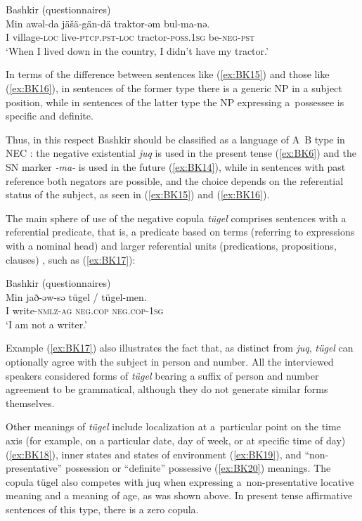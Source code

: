 \documentclass[output=paper]{langsci/langscibook}
\begin{document}
\ea Bashkir (questionnaires) \label{ex:BK16}\\
    \gll Min	awǝl-da		jäšä-gän-dä		traktor-ǝm  bul-ma-nǝ.\\
    I		village-\textsc{loc}	live-\textsc{ptcp.pst-loc}	tractor-\textsc{poss.1sg} be-\textsc{neg-pst}\\
	\glt `When I lived down in the country, I didn’t have my tractor.'
\z


In terms of the difference between sentences like (\ref{ex:BK15}) and those like (\ref{ex:BK16}), in sentences of the former type there is a generic NP in a subject position, while in sentences of the latter type the NP expressing a possessee is specific and definite.

Thus, in this respect Bashkir should be classified as a language of A~B type in NEC \citep{Veselinova2016}: the negative existential \textit{juq} is used in the present tense (\ref{ex:BK6}) and the SN marker \textit{-ma-} is used in the future (\ref{ex:BK14}), while in sentences with past reference both negators are possible, and the choice depends on the referential status of the subject, as seen in (\ref{ex:BK15}) and (\ref{ex:BK16}).

The main sphere of use of the negative copula \textit{tügel} comprises sentences with a referential predicate, that is, a predicate based on terms (referring to expressions with a nominal head) and larger referential units (predications, propositions, clauses) \citep[77–91]{hengeveld1992}, such as (\ref{ex:BK17}):

\ea Bashkir (questionnaires) \label{ex:BK17}\\
	\gll Min	jað-əw-sə			tügel			{/ tügel-men.}\\
	I		write-\textsc{nmlz-ag}	\textsc{neg.cop}		\textsc{neg.cop-1sg}\\
	\glt `I am not a writer.'
\z

Example (\ref{ex:BK17}) also illustrates the fact that, as distinct from \textit{juq}, \textit{tügel} can optionally agree with the subject in person and number. All the interviewed speakers considered forms of \textit{tügel} bearing a suffix of person and number agreement to be grammatical, although they do not generate similar forms themselves.

Other meanings of \textit{tügel} include localization at a particular point on the time axis (for example, on a particular date, day of week, or at specific time of day) (\ref{ex:BK18}), inner states and states of environment (\ref{ex:BK19}), and “non-presentative” possession \citep{hengeveld1992} or “definite” possessive \citep{stassen2009a} (\ref{ex:BK20}) meanings. The copula tügel also competes with juq when expressing a non-presentative locative meaning and a meaning of age, as was shown above. In present tense affirmative sentences of this type, there is a zero copula.
\end{document}
